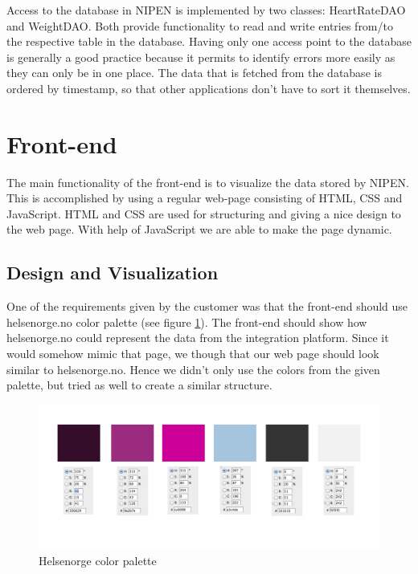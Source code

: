 Access to the database in NIPEN is implemented by two classes: HeartRateDAO and WeightDAO.
Both provide functionality to read and write entries from/to the respective table in the database.
Having only one access point to the database is generally a good practice because it permits to
identify errors more easily as they can only be in one place.
The data that is fetched from the database is ordered by timestamp, so that other applications
don't have to sort it themselves.



\section{Front-end}
\label{subsec:front-end}

The main functionality of the front-end is to visualize the data stored by NIPEN.%
This is accomplished by using a regular web-page consisting of HTML, CSS and JavaScript. HTML and CSS are used for structuring and giving a nice design to the web page. With help of JavaScript we are able to make the page dynamic.

\subsection{Design and Visualization}

One of the requirements given by the customer was that the front-end should use helsenorge.no color palette
(see figure \ref{figure:helsenorge-color-palette}).
The front-end should show how helsenorge.no could represent the data from the integration platform. 
Since it would somehow mimic that page, we though that our web page should look similar to helsenorge.no. 
Hence we didn't only use the colors from the given palette, but tried as well to create a similar structure.

\begin{figure}[h]
\centering
\includegraphics[scale=0.30]{../Figures/helsenorge_pallett.jpg}
\caption{Helsenorge color palette}
\label{figure:helsenorge-color-palette}
\end{figure}

